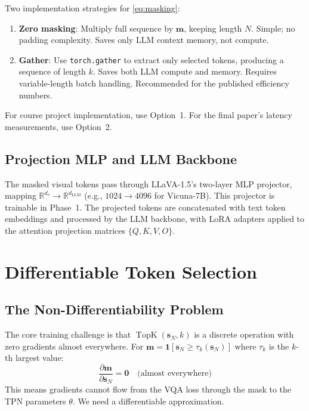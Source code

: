 \documentclass[12pt,a4paper]{article}
\DeclareMathOperator{\TopK}{TopK}
\newcommand{\R}{\mathbb{R}}
\newcommand{\vm}{\mathbf{m}}     %
\newcommand{\vs}{\mathbf{s}}     %
\begin{document}
\begin{implbox}
  Two implementation strategies for \cref{eq:masking}:
  \begin{enumerate}[leftmargin=1.5em]
    \item \textbf{Zero masking}: Multiply full sequence by $\vm$, keeping
      length $N$. Simple; no padding complexity. Saves only LLM context memory,
      not compute.
    \item \textbf{Gather}: Use \texttt{torch.gather} to extract only selected
      tokens, producing a sequence of length $k$. Saves both LLM compute and
      memory. Requires variable-length batch handling. Recommended for the
      published efficiency numbers.
  \end{enumerate}
  For course project implementation, use Option~1. For the final paper's
  latency measurements, use Option~2.
\end{implbox}

\subsection{Projection MLP and LLM Backbone}

The masked visual tokens pass through LLaVA-1.5's two-layer MLP projector,
mapping $\R^{d_v} \to \R^{d_{\mathrm{LLM}}}$ (e.g., $1024 \to 4096$ for
Vicuna-7B). This projector is trainable in Phase~1. The projected tokens are
concatenated with text token embeddings and processed by the LLM backbone, with
LoRA adapters applied to the attention projection matrices $\{Q, K, V, O\}$.

\section{Differentiable Token Selection}
\label{sec:gumbel}

\subsection{The Non-Differentiability Problem}

The core training challenge is that $\TopK(\vs_N, k)$ is a discrete operation
with zero gradients almost everywhere. For $\vm = \mathbf{1}[\vs_N \geq
\tau_k(\vs_N)]$ where $\tau_k$ is the $k$-th largest value:
\[
  \frac{\partial \vm}{\partial \vs_N} = \mathbf{0}
    \quad \text{(almost everywhere)}
\]
This means gradients cannot flow from the VQA loss through the mask to the TPN
parameters $\theta$. We need a differentiable approximation.
\end{document}
